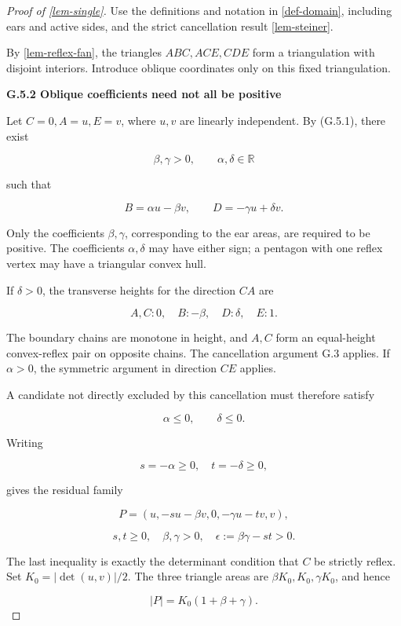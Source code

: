 \documentclass[11pt,a4paper]{article}
\theoremstyle{proofmanuscript}
\begin{document}
\begin{proof}[Proof of \ref{lem-single}]

Use the definitions and notation in \ref{def-domain}, including ears and active sides, and the strict cancellation result \ref{lem-steiner}.

By \ref{lem-reflex-fan}, the triangles \(ABC,ACE,CDE\) form a triangulation with disjoint interiors. Introduce oblique coordinates only on this fixed triangulation.

\textbf{G.5.2 Oblique coefficients need not all be positive}

Let \(C=0,A=u,E=v\), where \(u,v\) are linearly independent. By (G.5.1), there exist

\[
\beta,\gamma>0,\qquad\alpha,\delta\in\mathbb R
\]

such that

\[
B=\alpha u-\beta v,
\qquad D=-\gamma u+\delta v.
\tag{G.5.2}
\]

Only the coefficients \(\beta,\gamma\), corresponding to the ear areas, are required to be positive. The coefficients \(\alpha,\delta\) may have either sign; a pentagon with one reflex vertex may have a triangular convex hull.

If \(\delta>0\), the transverse heights for the direction \(CA\) are

\[
A,C:0,\quad B:-\beta,\quad D:\delta,\quad E:1.
\]

The boundary chains are monotone in height, and \(A,C\) form an equal-height convex-reflex pair on opposite chains. The cancellation argument G.3 applies. If \(\alpha>0\), the symmetric argument in direction \(CE\) applies.

A candidate not directly excluded by this cancellation must therefore satisfy

\[
\alpha\le0,\qquad\delta\le0.
\]

Writing

\[
s=-\alpha\ge0,\quad t=-\delta\ge0,
\]

gives the residual family

\[
\boxed{P=(u,-su-\beta v,0,-\gamma u-tv,v),}
\tag{G.5.3}
\]

\[
\boxed{s,t\ge0,\quad\beta,\gamma>0,
\quad\epsilon:=\beta\gamma-st>0.}
\tag{G.5.4}
\]

The last inequality is exactly the determinant condition that \(C\) be strictly reflex. Set \(K_0=|\det(u,v)|/2\). The three triangle areas are \(\beta K_0,K_0,\gamma K_0\), and hence

\[
|P|=K_0(1+\beta+\gamma).
\tag{G.5.5}
\]


\end{proof}
\end{document}
